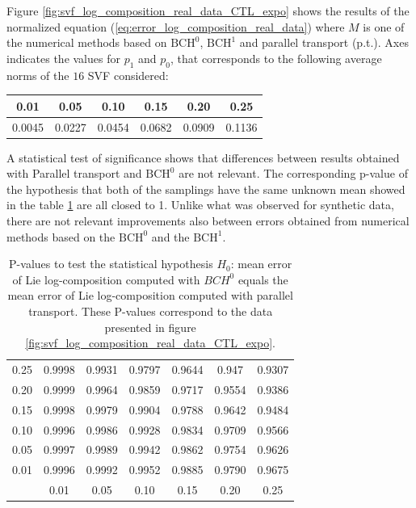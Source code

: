Figure \ref{fig:svf_log_composition_real_data_CTL_expo} shows the results of the normalized equation (\ref{eq:error_log_composition_real_data}) where $M$ is one of the numerical methods based on $\text{BCH}^0$, $\text{BCH}^1$ and parallel transport (p.t.).
Axes indicates the values for $p_1$ and $p_0$, that corresponds to the following average norms of the $16$ SVF considered:

\begin{center}
	 \centering
	 \begin{tabular}{ c | c | c | c | c | c  }
 	 0.01 & 0.05 & 0.10 & 0.15 & 0.20 & 0.25 \\
 	 \hline
 	 0.0045 &  0.0227 & 0.0454 & 0.0682 & 0.0909 & 0.1136
	 \end{tabular}
\end{center}

A statistical test of significance shows that differences between results obtained with Parallel transport and $\text{BCH}^0$ are not relevant. The corresponding p-value of the hypothesis that both of the samplings have the same unknown mean showed in the table \ref{tabel_p_vals} are all closed to 1. Unlike what was observed for synthetic data, there are not relevant improvements also between errors obtained from numerical methods based on the $\text{BCH}^0$ and the $\text{BCH}^1$.

\begin{table}
\centering
	\begin{tabular}{ c | c  c  c  c  c  c  }
	0.25	& 0.9998 & 0.9931 & 0.9797 & 0.9644 & 0.947  & 0.9307 \\
	0.20	& 0.9999  & 0.9964 &  0.9859 & 0.9717 & 0.9554 & 0.9386\\
	0.15	& 0.9998 & 0.9979 & 0.9904 & 0.9788 &  0.9642 & 0.9484\\
	0.10	& 0.9996 & 0.9986 & 0.9928 & 0.9834 & 0.9709 & 0.9566 \\
	0.05	& 0.9997  & 0.9989 & 0.9942 & 0.9862 & 0.9754 &  0.9626\\
	0.01	& 0.9996 & 0.9992 & 0.9952 & 0.9885 & 0.9790  & 0.9675 \\
		\hline
		& 0.01 & 0.05 & 0.10 & 0.15 & 0.20 & 0.25 \\
	\end{tabular}
	 \caption{P-values to test the statistical hypothesis $H_0$: mean error of Lie log-composition computed with $BCH^0$ equals the mean error of Lie log-composition computed with parallel transport. These P-values correspond to the data presented in figure \ref{fig:svf_log_composition_real_data_CTL_expo}. }
	 \label{tabel_p_vals}
	\end{table}

